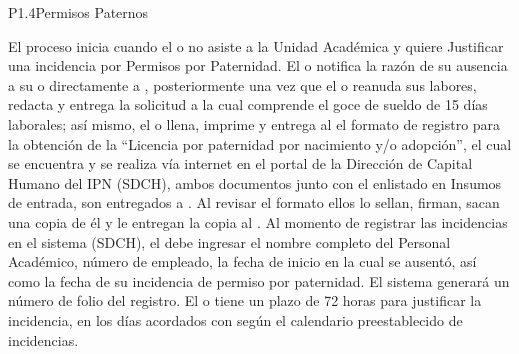 
\begin{Proceso}{P1.4}{Permisos Paternos} {
  
    \smallskip
    \bigskip 
    El proceso inicia cuando el  o  no asiste a la Unidad Académica y quiere Justificar una incidencia por Permisos por Paternidad. El  o  notifica la razón de su ausencia a su  o directamente a , posteriormente una vez que el  o  reanuda sus labores, redacta y entrega la solicitud a  la cual comprende el goce de sueldo de 15 días laborales; así mismo, el  o  llena, imprime y entrega al  el formato de registro para la obtención de la “Licencia por paternidad por nacimiento y/o adopción”,  el cual se encuentra y se realiza vía internet en el portal de la Dirección de Capital Humano del IPN (SDCH), ambos documentos junto con el enlistado en Insumos de entrada, son entregados a . Al revisar el formato ellos lo sellan, firman, sacan una copia de él y le entregan la copia al .
   Al momento de registrar las incidencias en el sistema (SDCH), el  debe ingresar el nombre completo del Personal Académico, número de empleado, la fecha de inicio en la cual se ausentó, así como la fecha de su incidencia de permiso por paternidad. El sistema generará un número de folio del registro. 
   El  o  tiene un plazo de 72 horas para justificar la incidencia, en los días acordados con  según el calendario preestablecido de incidencias. \newline
}
\end{Proceso}
